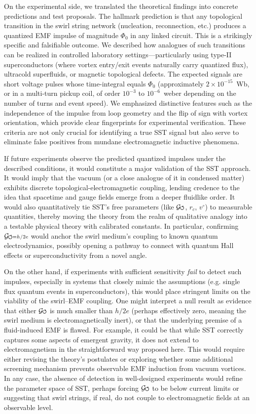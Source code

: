 \documentclass[12pt]{article}
\DeclareRobustCommand{\swirlarrow}{
\mathchoice{\mkern-2mu\scriptstyle\boldsymbol{\circlearrowleft}}%
{\mkern-2mu\scriptstyle\boldsymbol{\circlearrowleft}}%
{\mkern-2mu\scriptscriptstyle\boldsymbol{\circlearrowleft}}%
{\mkern-2mu\scriptscriptstyle\boldsymbol{\circlearrowleft}}
}%
\newcommand{\Gswirl}{\mathcal{G}\swirlarrow}
\begin{document}
On the experimental side, we translated the theoretical findings into concrete predictions and test proposals. The hallmark prediction is that any topological transition in the swirl string network (nucleation, reconnection, etc.) produces a quantized EMF impulse of magnitude $\Phi_{0}$ in any linked circuit. This is a strikingly specific and falsifiable outcome. We described how analogues of such transitions can be realized in controlled laboratory settings—particularly using type-II superconductors (where vortex entry/exit events naturally carry quantized flux), ultracold superfluids, or magnetic topological defects. The expected signals are short voltage pulses whose time-integral equals $\Phi_{0}$ (approximately $2\times10^{-15}$~Wb, or in a multi-turn pickup coil, of order $10^{-3}$ to $10^{-6}$~weber depending on the number of turns and event speed). We emphasized distinctive features such as the independence of the impulse from loop geometry and the flip of sign with vortex orientation, which provide clear fingerprints for experimental verification. These criteria are not only crucial for identifying a true SST signal but also serve to eliminate false positives from mundane electromagnetic inductive phenomena.


If future experiments observe the predicted quantized impulses under the described conditions, it would constitute a major validation of the SST approach. It would imply that the vacuum (or a close analogue of it in condensed matter) exhibits discrete topological-electromagnetic coupling, lending credence to the idea that spacetime and gauge fields emerge from a deeper fluidlike order. It would also quantitatively tie SST’s free parameters (like $\Gswirl$, $r_c$, $v^{\circ}$) to measurable quantities, thereby moving the theory from the realm of qualitative analogy into a testable physical theory with calibrated constants. In particular, confirming $\Gswirl = h/2e$ would anchor the swirl medium’s coupling to known quantum electrodynamics, possibly opening a pathway to connect with quantum Hall effects or superconductivity from a novel angle.


On the other hand, if experiments with sufficient sensitivity \emph{fail} to detect such impulses, especially in systems that closely mimic the assumptions (e.g. single flux quantum events in superconductors), this would place stringent limits on the viability of the swirl–EMF coupling. One might interpret a null result as evidence that either $\Gswirl$ is much smaller than $h/2e$ (perhaps effectively zero, meaning the swirl medium is electromagnetically inert), or that the underlying premise of a fluid-induced EMF is flawed. For example, it could be that while SST correctly captures some aspects of emergent gravity, it does not extend to electromagnetism in the straightforward way proposed here. This would require either revising the theory’s postulates or exploring whether some additional screening mechanism prevents observable EMF induction from vacuum vortices. In any case, the absence of detection in well-designed experiments would refine the parameter space of SST, perhaps forcing $\Gswirl$ to be below current limits or suggesting that swirl strings, if real, do not couple to electromagnetic fields at an observable level.
\end{document}
